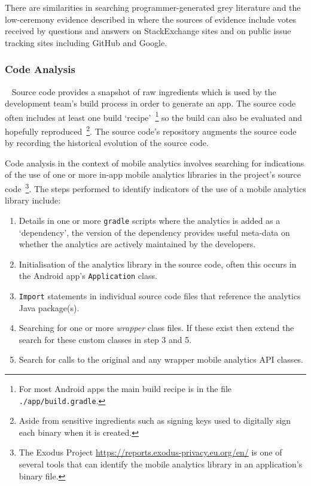 There are similarities in searching programmer-generated grey literature and the low-ceremony evidence described in \citet{scaffidi2007_toawards_a_calculus_of_confidence, scaffidi2007developing} where the sources of evidence include votes received by questions and answers on StackExchange sites and on public issue tracking sites including GitHub and Google. %

\subsubsection{Code Analysis}~\label{section-code-analysis-research-method}   
Source code provides a snapshot of raw ingredients which is used by the development team's build process in order to generate an app. The source code often includes at least one build `recipe'~\footnote{For most Android apps the main build recipe is in the file \texttt{./app/build.gradle}.} so the build can also be evaluated and hopefully reproduced~\footnote{Aside from sensitive ingredients such as signing keys used to digitally sign each binary when it is created.}. The source code's repository augments the source code by recording the historical evolution of the source code.

Code analysis in the context of mobile analytics involves searching for indications of the use of one or more in-app mobile analytics libraries in the project's source code~\footnote{The Exodus Project \url{https://reports.exodus-privacy.eu.org/en/} is one of several tools that can identify the mobile analytics library in an application's binary file.}. The steps performed to identify indicators %
of the use of a mobile analytics library include:

\begin{enumerate}
    \itemsep 0em
    \item Details in one or more \texttt{gradle} scripts where the analytics is added as a `dependency', the version of the dependency provides useful meta-data on whether the analytics are actively maintained by the developers. %
    \item Initialisation of the analytics library in the source code, often this occurs in the Android app's \texttt{Application} class. %
    \item \texttt{Import} statements in individual source code files that reference the analytics Java package(s).
    \item Searching for one or more \textit{wrapper} class files. If these exist then extend the search for these custom classes in step 3 and 5.
    \item Search for calls to the original and any wrapper mobile analytics API classes. %
\end{enumerate}

